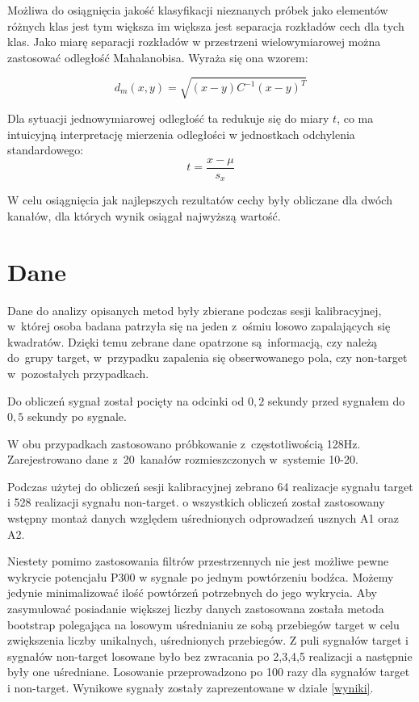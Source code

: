 \documentclass[licencjacka,openright]{pracamgr}
\begin{document}
Możliwa do osiągnięcia jakość klasyfikacji nieznanych próbek jako elementów różnych klas jest tym większa im większa jest separacja rozkładów cech dla tych klas. Jako miarę separacji rozkładów w przestrzeni wielowymiarowej można zastosować odległość Mahalanobisa. Wyraża się ona wzorem:

\begin{equation}
d_{m}{(x,y)}=\sqrt{(x-y)C^{-1}(x-y)^T}
\end{equation}

Dla sytuacji jednowymiarowej odległość ta redukuje się do miary $t$, co ma intuicyjną interpretację mierzenia odległości w jednostkach odchylenia standardowego:
\begin{equation}
t = \frac{x-\mu}{s_x}
\end{equation}

W celu osiągnięcia jak najlepszych rezultatów cechy były obliczane dla dwóch kanałów, dla których wynik osiągał najwyższą wartość.

\chapter{Dane}
Dane do analizy opisanych metod były zbierane podczas sesji kalibracyjnej, w~której osoba badana patrzyła się na jeden z~ośmiu losowo zapalających się kwadratów. Dzięki temu zebrane dane opatrzone są~informacją, czy należą do~grupy target, w~przypadku zapalenia się obserwowanego pola, czy non-target w~pozostałych przypadkach.

Do obliczeń sygnał został pocięty na odcinki od $0,2$ sekundy przed sygnałem do $0,5$  sekundy po sygnale.

W obu przypadkach zastosowano próbkowanie z~częstotliwością 128Hz. Zarejestrowano dane z~20~kanałów rozmieszczonych w~systemie 10-20.

Podczas użytej do obliczeń sesji kalibracyjnej zebrano 64 realizacje sygnału target i 528 realizacji sygnału non-target. o wszystkich obliczeń został zastosowany wstępny montaż danych względem uśrednionych odprowadzeń usznych A1 oraz A2. 

Niestety pomimo zastosowania filtrów przestrzennych nie jest możliwe pewne wykrycie potencjału P300 w sygnale po jednym powtórzeniu bodźca. Możemy jedynie minimalizować ilość powtórzeń potrzebnych do jego wykrycia. Aby zasymulować posiadanie większej liczby danych zastosowana została metoda bootstrap polegająca na losowym uśrednianiu ze sobą przebiegów target w celu zwiększenia liczby unikalnych, uśrednionych przebiegów. Z puli sygnałów target i sygnałów non-target losowane było bez zwracania po 2,3,4,5 realizacji a następnie były one uśredniane. Losowanie przeprowadzono po 100 razy dla sygnałów target i non-target. Wynikowe sygnały zostały zaprezentowane w dziale \ref{wyniki}.
\end{document}
